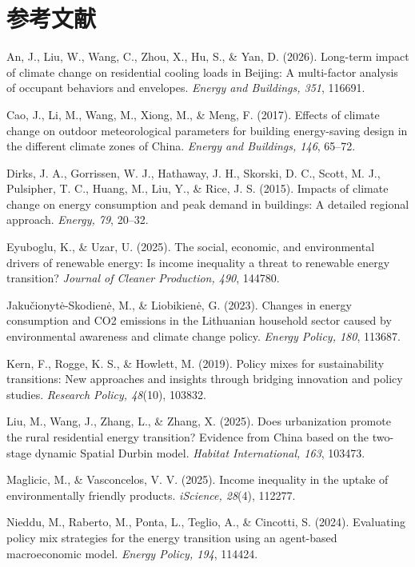 \documentclass[12pt,a4paper]{ctexart}
\begin{document}
\section{参考文献}
\begin{enumerate}[label={[\arabic*]}]
  \item An, J., Liu, W., Wang, C., Zhou, X., Hu, S., \& Yan, D. (2026). Long-term impact of climate change on residential cooling loads in Beijing: A multi-factor analysis of occupant behaviors and envelopes. \textit{Energy and Buildings, 351}, 116691.
  \item Cao, J., Li, M., Wang, M., Xiong, M., \& Meng, F. (2017). Effects of climate change on outdoor meteorological parameters for building energy-saving design in the different climate zones of China. \textit{Energy and Buildings, 146}, 65--72.
  \item Dirks, J. A., Gorrissen, W. J., Hathaway, J. H., Skorski, D. C., Scott, M. J., Pulsipher, T. C., Huang, M., Liu, Y., \& Rice, J. S. (2015). Impacts of climate change on energy consumption and peak demand in buildings: A detailed regional approach. \textit{Energy, 79}, 20--32.
  \item Eyuboglu, K., \& Uzar, U. (2025). The social, economic, and environmental drivers of renewable energy: Is income inequality a threat to renewable energy transition? \textit{Journal of Cleaner Production, 490}, 144780.
  \item Jakučionytė-Skodienė, M., \& Liobikienė, G. (2023). Changes in energy consumption and CO2 emissions in the Lithuanian household sector caused by environmental awareness and climate change policy. \textit{Energy Policy, 180}, 113687.
  \item Kern, F., Rogge, K. S., \& Howlett, M. (2019). Policy mixes for sustainability transitions: New approaches and insights through bridging innovation and policy studies. \textit{Research Policy, 48}(10), 103832.
  \item Liu, M., Wang, J., Zhang, L., \& Zhang, X. (2025). Does urbanization promote the rural residential energy transition? Evidence from China based on the two-stage dynamic Spatial Durbin model. \textit{Habitat International, 163}, 103473.
  \item Maglicic, M., \& Vasconcelos, V. V. (2025). Income inequality in the uptake of environmentally friendly products. \textit{iScience, 28}(4), 112277.
  \item Nieddu, M., Raberto, M., Ponta, L., Teglio, A., \& Cincotti, S. (2024). Evaluating policy mix strategies for the energy transition using an agent-based macroeconomic model. \textit{Energy Policy, 194}, 114424.

\end{enumerate}
\end{document}
